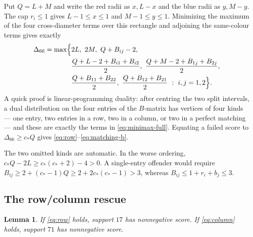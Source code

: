 \documentclass[11pt]{article}
\theoremstyle{plain}
\newtheorem{lemma}[theorem]{Lemma}
\theoremstyle{definition}
\theoremstyle{remark}
\newcommand{\cstar}{c_{\!*}}
\begin{document}
Put $Q=L+M$ and write the red radii as $x,L-x$ and the blue radii as
$y,M-y$.  The cap $r_i\le1$ gives $L-1\le x\le1$ and $M-1\le y\le1$.
Minimizing the maximum of the four cross-diameter terms over this rectangle
and adjoining the same-colour terms gives exactly
\begin{align}\label{eq:minimax-full}
 \Delta_{66}=\max\Bigl\{&2L,\ 2M,\ Q+B_{ij}-2,\notag\\
 &\frac{Q+L-2+B_{i1}+B_{i2}}{2},\ \frac{Q+M-2+B_{1j}+B_{2j}}{2},\notag\\
 &\frac{Q+B_{11}+B_{22}}{2},\ \frac{Q+B_{12}+B_{21}}{2}
 \ :\ i,j=1,2\Bigr\}.
\end{align}
A quick proof is linear-programming duality: after centring the two split
intervals, a dual distribution on the four entries of the $B$-matrix has
vertices of four kinds --- one entry, two entries in a row, two in a
column, or two in a perfect matching --- and these are exactly the terms in
\eqref{eq:minimax-full}.  Equating a failed score to
$\Delta_{66}\ge\cstar Q$ gives \eqref{eq:row}--\eqref{eq:matching-b}.

The two omitted kinds are automatic.  In the worse ordering,
$\cstar Q-2L\ge\cstar(\cstar+2)-4>0$.  A single-entry offender would
require $B_{ij}\ge2+(\cstar-1)Q\ge2+2\cstar(\cstar-1)>3$, whereas
$B_{ij}\le1+r_i+b_j\le3$.

\subsection{The row/column rescue}

\begin{lemma}\label{lem:row-rescue}
If \eqref{eq:row} holds, support $17$ has nonnegative score.  If
\eqref{eq:column} holds, support $71$ has nonnegative score.
\end{lemma}
\end{document}
